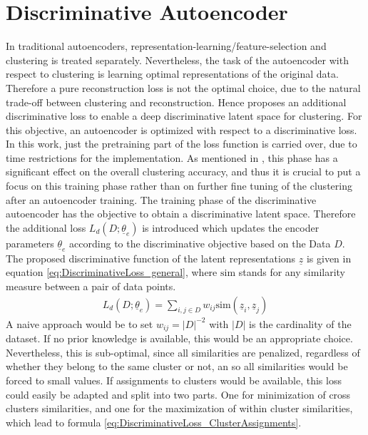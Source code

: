 \documentclass[12pt,DIV14,BCOR12mm,a4paper,footexclude,headinclude,halfparskip-,twoside,openright,cleardoubleempty,idxtotoc,bibtotoc,listtotoc,abstracton]{scrreprt} %
\numberwithin{equation}{chapter}
\begin{document}
\section{Discriminative Autoencoder}
In traditional autoencoders, representation-learning/feature-selection and clustering is treated separately. Nevertheless, the task of the autoencoder with respect to clustering is learning optimal representations of the original data. Therefore a pure reconstruction loss is not the optimal choice, due to the natural trade-off between clustering and reconstruction. Hence \cite{DiscriminativeClustering} proposes an additional discriminative loss to enable a deep discriminative latent space for clustering. For this objective, an autoencoder is optimized with respect to a discriminative loss. In this work, just the pretraining part of the loss function is carried over, due to time restrictions for the implementation. As mentioned in \cite{DiscriminativeClustering}, this phase has a significant effect on the overall clustering accuracy, and thus it is crucial to put a focus on this training phase rather than on further fine tuning of the clustering after an autoencoder training. The training phase of the discriminative autoencoder has the objective to obtain a discriminative latent space. Therefore the additional loss $L_d(D;\underline{\theta}_e)$ is introduced which updates the encoder parameters $\underline{\theta}_e$ according to the discriminative objective based on the Data $D$. The proposed discriminative function of the latent representations $\underline{z}$ is given in equation \ref{eq:DiscriminativeLoss_general}, where $\textrm{sim}$ stands for any similarity measure between a pair of data points.
\begin{align}
	 L_d(D;\underline{\theta}_e) = \sum_{i,j \in D}w_{ij}\textrm{sim}(\underline{z}_i,\underline{z}_j)\label{eq:DiscriminativeLoss_general}
\end{align}
A naive approach would be to set $w_{ij} = |D|^{-2}$ with $|D|$ is the cardinality of the dataset. If no prior knowledge is available, this would be an appropriate choice. Nevertheless, this is sub-optimal, since all similarities are penalized, regardless of whether they belong to the same cluster or not, an so all similarities would be forced to small values. If assignments to clusters would be available, this loss could easily be adapted and split into two parts. One for minimization of cross clusters similarities, and one for the maximization of within cluster similarities, which lead to formula \ref{eq:DiscriminativeLoss_ClusterAssignments}.
\end{document}
